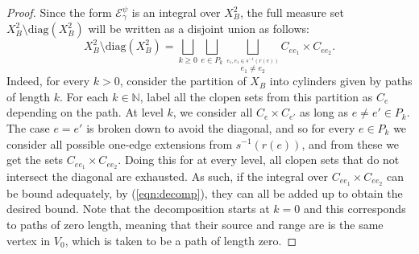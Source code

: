 \documentclass[12pt]{amsart}
\theoremstyle{plain}
\theoremstyle{definition}
\begin{document}
\begin{proof}
Since the form $\mathcal{E}^\psi _\gamma$ is an integral over $X^2_B$, the full measure set $X^2_B\setminus \mathrm{diag}(X^2_B)$ will be written as a disjoint union as follows:
\begin{equation}
\label{eqn:decomp}
    X^2_B\setminus \mathrm{diag}(X^2_B) = \bigsqcup_{k\geq 0} \bigsqcup_{e\in P_k} \bigsqcup_{\overset{e_1,e_1\in s^{-1}(r(e))}{e_1\neq e_2}} C_{ee_1}\times C_{ee_2}.
\end{equation}
Indeed, for every $k>0$, consider the partition of $X_B$ into cylinders given by paths of length $k$. For each $k\in\mathbb{N}$, label all the clopen sets from this partition as $C_e$ depending on the path. At level $k$, we consider all $C_{e}\times C_{e'}$ as long as $e\neq e'\in P_k$. The case $e = e'$ is broken down to avoid the diagonal, and so for every $e\in P_k$ we consider all possible one-edge extensions from $s^{-1}(r(e))$, and from these we get the sets $C_{ee_1}\times C_{ee_2}$. Doing this for at every level, all clopen sets that do not intersect the diagonal are exhausted. As such, if the integral over $C_{ee_1}\times C_{ee_2}$ can be bound adequately, by (\ref{eqn:decomp}), they can all be added up to obtain the desired bound. Note that the decomposition starts at $k = 0$ and this corresponds to paths of zero length, meaning that their source and range are is the same vertex in $V_0$, which is taken to be a path of length zero.


\end{proof}
\end{document}
